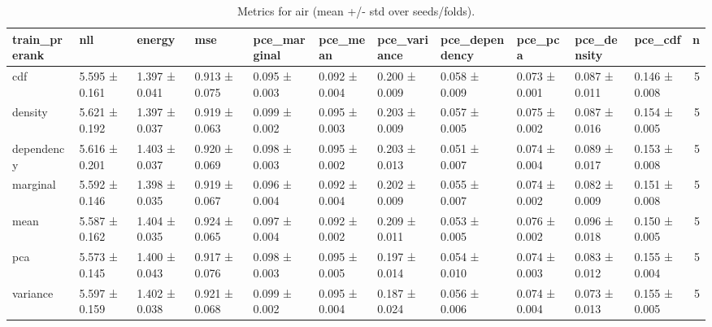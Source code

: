 \begin{table}
\caption{Metrics for air (mean +/- std over seeds/folds).}
\label{tab:metrics_summary_air}
\begin{tabular}{lllllllllllr}
\toprule
train_prerank & nll & energy & mse & pce_marginal & pce_mean & pce_variance & pce_dependency & pce_pca & pce_density & pce_cdf & n \\
\midrule
cdf & 5.595 ± 0.161 & 1.397 ± 0.041 & 0.913 ± 0.075 & 0.095 ± 0.003 & 0.092 ± 0.004 & 0.200 ± 0.009 & 0.058 ± 0.009 & 0.073 ± 0.001 & 0.087 ± 0.011 & 0.146 ± 0.008 & 5 \\
density & 5.621 ± 0.192 & 1.397 ± 0.037 & 0.919 ± 0.063 & 0.099 ± 0.002 & 0.095 ± 0.003 & 0.203 ± 0.009 & 0.057 ± 0.005 & 0.075 ± 0.002 & 0.087 ± 0.016 & 0.154 ± 0.005 & 5 \\
dependency & 5.616 ± 0.201 & 1.403 ± 0.037 & 0.920 ± 0.069 & 0.098 ± 0.003 & 0.095 ± 0.002 & 0.203 ± 0.013 & 0.051 ± 0.007 & 0.074 ± 0.004 & 0.089 ± 0.017 & 0.153 ± 0.008 & 5 \\
marginal & 5.592 ± 0.146 & 1.398 ± 0.035 & 0.919 ± 0.067 & 0.096 ± 0.004 & 0.092 ± 0.004 & 0.202 ± 0.009 & 0.055 ± 0.007 & 0.074 ± 0.002 & 0.082 ± 0.009 & 0.151 ± 0.008 & 5 \\
mean & 5.587 ± 0.162 & 1.404 ± 0.035 & 0.924 ± 0.065 & 0.097 ± 0.004 & 0.092 ± 0.002 & 0.209 ± 0.011 & 0.053 ± 0.005 & 0.076 ± 0.002 & 0.096 ± 0.018 & 0.150 ± 0.005 & 5 \\
pca & 5.573 ± 0.145 & 1.400 ± 0.043 & 0.917 ± 0.076 & 0.098 ± 0.003 & 0.095 ± 0.005 & 0.197 ± 0.014 & 0.054 ± 0.010 & 0.074 ± 0.003 & 0.083 ± 0.012 & 0.155 ± 0.004 & 5 \\
variance & 5.597 ± 0.159 & 1.402 ± 0.038 & 0.921 ± 0.068 & 0.099 ± 0.002 & 0.095 ± 0.004 & 0.187 ± 0.024 & 0.056 ± 0.006 & 0.074 ± 0.004 & 0.073 ± 0.013 & 0.155 ± 0.005 & 5 \\
\bottomrule
\end{tabular}
\end{table}
